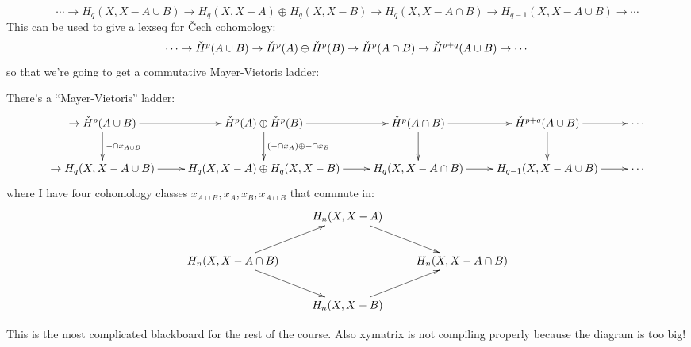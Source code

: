 \begin{equation*}
\cdots\to H_q(X,X-A\cup B)\to H_q(X,X-A)\oplus H_q(X,X-B)\to H_q(X,X-A\cap B)\to H_{q-1}(X,X-A\cup B)\to\cdots
\end{equation*}
This can be used to give a lexseq for \v{C}ech cohomology:
\begin{equation*}
\cdots\to \check{H}^p(A\cup B)\to \check{H}^p(A)\oplus \check{H}^p(B)\to \check{H}^p(A\cap B)\to \check{H}^{p+q}(A\cup B)\to\cdots
\end{equation*}
so that we're going to get a commutative Mayer-Vietoris ladder:
\begin{theorem}
There's a ``Mayer-Vietoris'' ladder:
\begin{equation*}
\xymatrix{
	\to\cHH^p(A\cup B)\ar[r]\ar[d]^{-\cap x_{A\cup B}} & \cHH^p(A)\oplus \cHH^p(B)\ar[r]\ar[d]^{(-\cap x_A)\oplus -\cap x_B} & \cHH^p(A\cap B)\ar[r]\ar[d] & \cHH^{p+q}(A\cup B)\ar[r]\ar[d] & \cdots\\
	\to H_q(X,X-A\cup B)\ar[r]& H_q(X,X-A)\oplus H_q(X,X-B)\ar[r]& H_q(X,X-A\cap B)\ar[r]& H_{q-1}(X,X-A\cup B)\ar[r]&\cdots
}
\end{equation*}
where I have four cohomology classes $x_{A \cup B},x_A,x_B,x_{A\cap B}$ that commute in:
\begin{equation*}
\xymatrix{
	 & H_n(X,X-A)\ar[dr] & \\
	H_n(X,X-A\cap B)\ar[ur]\ar[dr] & & H_n(X,X-A\cap B)\\
	 & H_n(X,X-B)\ar[ur]
}
\end{equation*}
\end{theorem}
This is the most complicated blackboard for the rest of the course. Also xymatrix is not compiling properly because the diagram is too big!
